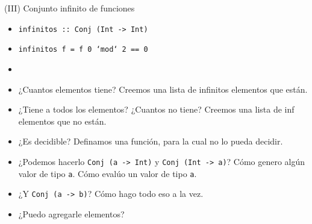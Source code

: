 \documentclass[pdf
]{beamer}
\begin{document}
\begin{frame}{(III) Conjunto infinito de funciones}

\begin{itemize}
\item \texttt{infinitos :: Conj (Int -> Int)}
\item \texttt{infinitos f = f 0 `mod` 2 == 0}
\item
\item ¿Cuantos elementos tiene? \pause Creemos una lista de infinitos elementos que están.
\pause
\item ¿Tiene a todos los elementos? ¿Cuantos no tiene? \pause Creemos una lista de inf elementos que no están.
\pause
\item ¿Es decidible? \pause Definamos una función, para la cual no lo pueda decidir.
\pause
\item ¿Podemos hacerlo \texttt{Conj (a -> Int)} y \texttt{Conj (Int -> a)}? \pause Cómo genero algún valor de tipo \texttt{a}. \pause Cómo evalúo un valor de tipo \texttt{a}.
\pause
\item ¿Y \texttt{Conj (a -> b)}? \pause Cómo hago todo eso a la vez.
\pause
\item ¿Puedo agregarle elementos? 
\end{itemize}

\end{frame}
\end{document}
